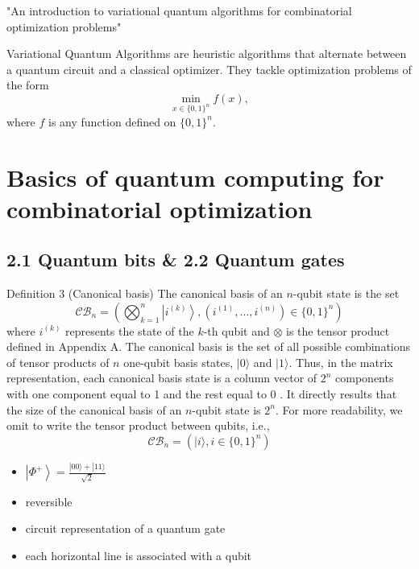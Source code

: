 "An introduction to variational quantum algorithms for combinatorial optimization problems" \cite{grange2023introduction}

\vspace{10pt}

Variational Quantum Algorithms are heuristic algorithms that alternate between a quantum circuit and a classical optimizer. They tackle optimization problems of the form
\begin{equation}
    \min _{x \in\{0,1\}^n} f(x), \tag{1}
\end{equation}
where $f$ is any function defined on $\{0,1\}^n$. 


\section{Basics of quantum computing for combinatorial optimization}

\subsection{2.1 Quantum bits \& 2.2 Quantum gates}

Definition 3 (Canonical basis) The canonical basis of an $n$-qubit state is the set
$$
\mathcal{C B}_{n}=\left(\bigotimes_{k=1}^{n}\left|i^{(k)}\right\rangle,\left(i^{(1)}, \ldots, i^{(n)}\right) \in\{0,1\}^{n}\right)
$$
where $i^{(k)}$ represents the state of the $k$-th qubit and $\otimes$ is the tensor product defined in Appendix A. The canonical basis is the set of all possible combinations of tensor products of $n$ one-qubit basis states, $|0\rangle$ and $|1\rangle$. Thus, in the matrix representation, each canonical basis state is a column vector of $2^{n}$ components with one component equal to 1 and the rest equal to 0 . It directly results that the size of the canonical basis of an $n$-qubit state is $2^{n}$. For more readability, we omit to write the tensor product between qubits, i.e.,
$$
\mathcal{C B}_{n}=\left(|i\rangle, i \in\{0,1\}^{n}\right)
$$
\begin{remark}
    \begin{itemize}
        \item $\left|\Phi^{+}\right\rangle=\frac{|00\rangle+|11\rangle}{\sqrt{2}}$
        \item reversible %
        \item circuit representation of a quantum gate
        \item each horizontal line is associated with a qubit
    \end{itemize}
\end{remark}

